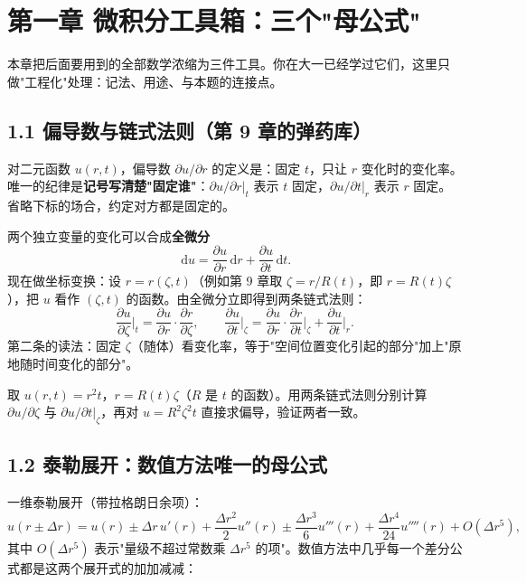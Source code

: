 \documentclass[12pt,a4paper]{ctexart}
\newcommand{\dd}{\,\mathrm{d}}
\newcommand{\pdd}[2]{\dfrac{\partial #1}{\partial #2}}
\newcommand{\handon}[1]{\par\smallskip\noindent{\heiti 【手推练习】}#1\par\smallskip}
\begin{document}
\section{第一章 微积分工具箱：三个"母公式"}

本章把后面要用到的全部数学浓缩为三件工具。你在大一已经学过它们，这里只做"工程化"处理：记法、用途、与本题的连接点。

\subsection{1.1 偏导数与链式法则（第 9 章的弹药库）}

对二元函数 $u(r,t)$，偏导数 $\partial u/\partial r$ 的定义是：固定 $t$，只让 $r$ 变化时的变化率。唯一的纪律是\textbf{记号写清楚"固定谁"}：$\partial u/\partial r|_t$ 表示 $t$ 固定，$\partial u/\partial t|_r$ 表示 $r$ 固定。省略下标的场合，约定对方都是固定的。

两个独立变量的变化可以合成\textbf{全微分}
\begin{equation}
\dd u=\pdd{u}{r}\dd r+\pdd{u}{t}\dd t .
\end{equation}
现在做坐标变换：设 $r=r(\zeta,t)$（例如第 9 章取 $\zeta=r/R(t)$，即 $r=R(t)\zeta$），把 $u$ 看作 $(\zeta,t)$ 的函数。由全微分立即得到两条链式法则：
\begin{equation}
\pdd{u}{\zeta}\Big|_t=\pdd{u}{r}\cdot\pdd{r}{\zeta},\qquad
\pdd{u}{t}\Big|_\zeta=\pdd{u}{r}\cdot\pdd{r}{t}\Big|_\zeta+\pdd{u}{t}\Big|_r .
\end{equation}
第二条的读法：固定 $\zeta$（随体）看变化率，等于"空间位置变化引起的部分"加上"原地随时间变化的部分"。

\handon{取 $u(r,t)=r^2t$，$r=R(t)\zeta$（$R$ 是 $t$ 的函数）。用两条链式法则分别计算 $\partial u/\partial\zeta$ 与 $\partial u/\partial t|_\zeta$，再对 $u=R^2\zeta^2t$ 直接求偏导，验证两者一致。}

\subsection{1.2 泰勒展开：数值方法唯一的母公式}

一维泰勒展开（带拉格朗日余项）：
\begin{equation}
u(r\pm\Delta r)=u(r)\pm\Delta r\,u'(r)+\frac{\Delta r^2}{2}u''(r)\pm\frac{\Delta r^3}{6}u'''(r)+\frac{\Delta r^4}{24}u''''(r)+O(\Delta r^5),
\end{equation}
其中 $O(\Delta r^5)$ 表示"量级不超过常数乘 $\Delta r^5$ 的项"。数值方法中几乎每一个差分公式都是这两个展开式的加加减减：
\end{document}
